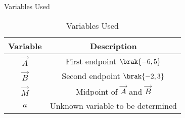 \begin{frame}{Variables Used}
\begin{table}[h!]
    \centering
    \begin{tabular}{ |c| c| }
        \hline
        \textbf{Variable} & \textbf{Description} \\ \hline
        $\vec{A}$ & First endpoint $\brak{-6,5}$ \\ \hline
        $\vec{B}$ & Second endpoint $\brak{-2,3}$ \\ \hline
        $\vec{M}$ & Midpoint of $\vec{A}$ and $\vec{B}$ \\ \hline
        $a$ & Unknown variable to be determined \\ \hline
    \end{tabular}
    \caption{Variables Used}
    \label{tab10.5.7.1}
\end{table}
\end{frame}